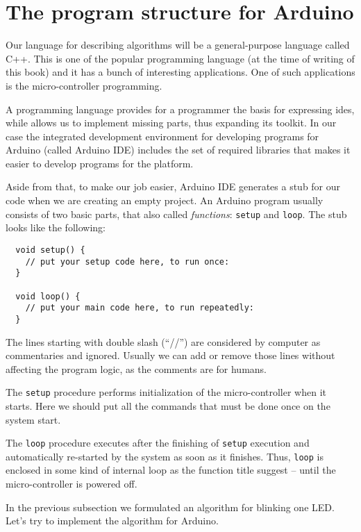 \documentclass[../sparc.tex]{subfiles}
\begin{document}
\section{The program structure for Arduino}

Our language for describing algorithms will be a general-purpose language called
C++.  This is one of the popular programming language (at the time of writing of
this book) and it has a bunch of interesting applications.  One of such
applications is the micro-controller programming.

A programming language provides for a programmer the basis for expressing ides,
while allows us to implement missing parts, thus expanding its toolkit.  In our
case the integrated development environment for developing programs for Arduino
(called Arduino IDE) includes the set of required libraries that makes it easier
to develop programs for the platform.

Aside from that, to make our job easier, Arduino IDE generates a stub for our
code when we are creating an empty project.  An Arduino program usually consists
of two basic parts, that also called \emph{functions}: \texttt{setup} and
\texttt{loop}.  The stub looks like the following:

\begin{verbatim}
  void setup() {
    // put your setup code here, to run once:
  }

  void loop() {
    // put your main code here, to run repeatedly:
  }
\end{verbatim}

The lines starting with double slash (``//'') are considered by computer as
commentaries and ignored.  Usually we can add or remove those lines without
affecting the program logic, as the comments are for humans.

The \texttt{setup} procedure performs initialization of the micro-controller
when it starts.  Here we should put all the commands that must be done once on
the system start.

The \texttt{loop} procedure executes after the finishing of \texttt{setup}
execution and automatically re-started by the system as soon as it finishes.
Thus, \texttt{loop} is enclosed in some kind of internal loop as the function
title suggest -- until the micro-controller is powered off.

In the previous subsection we formulated an algorithm for blinking one LED.
Let's try to implement the algorithm for Arduino.
\end{document}
